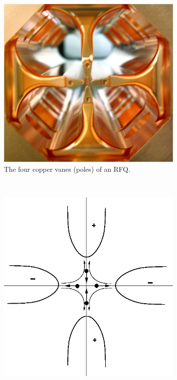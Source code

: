 \begin{figure}[!ht]
  \centering
  \begin{subfigure}[t]{0.3\textwidth}
    \includegraphics[width=\textwidth]{02_BeamDiag/figures/fig000_RFQ_c}
    \caption[The four copper vanes of an RFQ]{The four copper vanes (poles) of an RFQ.}
    \label{chap2:fig:RFQ_c}
  \end{subfigure}
  ~
  \begin{subfigure}[t]{.3\textwidth}
    \includegraphics[width=\textwidth]{02_BeamDiag/figures/fig000_RFQ_a}

\end{subfigure}
\end{figure}
